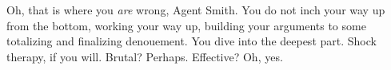 Oh, that is where you \textit{are} wrong, Agent Smith. You do not inch
your way up from the bottom, working your way up, building your
arguments to some totalizing and finalizing denouement. You dive into
the deepest part. Shock therapy, if you will. Brutal? Perhaps.
Effective? Oh, yes.
